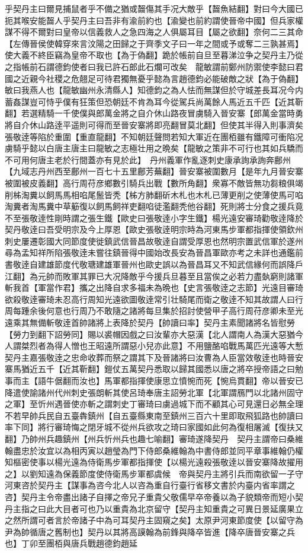 乎契丹主曰爾見捕鼠者乎不備之猶或齧傷其手况大敵乎【齧魚結翻】對曰今大國已扼其喉安能齧人乎契丹主曰吾非有渝前約也【渝變也前約謂使晉帝中國】但兵家權謀不得不爾對曰皇帝以信義救人之急四海之人俱屬耳目【屬之欲翻】奈何二三其命【左傳晉侯使韓穿來言汶陽之田歸之于齊季文子曰一年之間或予或奪二三孰甚焉】使大義不終臣竊為皇帝不取也【為于偽翻】跪於帳前自旦至暮涕泣争之契丹主乃從之指帳前石謂德鈞使者曰我已許石郎此石爛可改矣　龍敏謂前鄭州防禦使李懿曰君國之近親今社稷之危翹足可待君獨無憂乎懿為言趙德鈞必能破敵之狀【為于偽翻】敏曰我燕人也【龍敏幽州永清縣人】知德鈞之為人怯而無謀但於守城差長耳况今内蓄姦謀豈可恃乎僕有狂策但恐朝廷不肯為耳今從駕兵尚萬餘人馬近五千匹【近其靳翻】若選精騎一千使僕與郎萬金將之自介休山路夜冒虜騎入晉安寨【郎萬金當時勇將自介休山路逹平遥則可得而至晉安寨將即亮翻冒莫北翻】但使其半得入則事濟矣張敬逹等陷於重圍【重直龍翻】不知朝廷聲問若知大軍近在團栢雖有鐵障可衝陷况虜騎乎懿以白唐主唐主曰龍敏之志極壮用之晩矣【龍敏之策非不可行也其如兵驕而不可用何唐主老於行間蓋亦有見於此】　丹州義軍作亂逐刺史康承詢承詢奔鄜州【九域志丹州西至鄜州一百七十五里鄜芳蕪翻】晉安寨被圍數月【是年九月晉安寨被圍被皮義翻】高行周苻彦鄉數引騎兵出戰【數所角翻】衆寡不敵皆無功芻粮俱竭削柹淘糞以飼馬馬相啗尾鬛皆秃【柹方肺翻斫木札也木札已薄更削之使薄使馬可啗淘糞者淘馬糞中草䈥復以飼馬飼祥吏翻啗徒濫翻秃他谷翻】死則將士分食之援兵竟不至張敬逹性剛時謂之張生鐵【歐史曰張敬逹小字生鐵】楊光遠安審琦勸敬逹降於契丹敬逹曰吾受明宗及今上厚恩【歐史張敬逹明宗時為河東馬步軍都指揮使領欽州刺史屢遷彰國大同節度使徙鎮武信晉昌故敬逹自謂受厚恩也然明宗置武信軍於遂州尋為孟知祥所陷張敬逹未嘗往鎮晉得中國始改長安為晉昌軍歐亦考之未詳也通鑑前書敬逹自建雄節度代敬瑭建雄軍晉州也歐史誤以為晉昌耳又不知武信緣何而誤降戶江翻】為元帥而敗軍其罪已大况降敵乎今援兵旦暮至且當俟之必若力盡埶窮則諸軍斬我首【軍當作君】攜之出降自求多福未為晩也【史言張敬逹之志節】光遠目審琦欲殺敬逹審琦未忍高行周知光遠欲圖敬逹常引壮騎尾而衛之敬逹不知其故謂人曰行周每踵余後何意也行周乃不敢隨之諸將每旦集於招討使營甲子高行周苻彦卿未至光遠乘其無備斬敬逹首帥諸將上表降於契丹【帥讀曰率】契丹主素聞諸將名皆慰勞【勞力到翻下詔勞同】賜以裘帽因戲之曰汝輩亦大惡漢【北人謂南人為漢大惡猶今人謂桀烈者為得人憎也王昭遠所謂惡小兒亦此意】不用鹽酪啗戰馬萬匹光遠等大慙契丹主嘉張敬逹之忠命收葬而祭之謂其下及晉諸將曰汝曹為人臣當效敬逹也時晉安寨馬猶近五千【近其靳翻】鎧仗五萬契丹悉取以歸其國悉以唐之將卒授帝語之曰勉事而主【語牛倨翻而汝也】馬軍都指揮使康思立憤惋而死【惋烏貫翻】帝以晉安已降遣使諭諸州代州刺史張朗斬其使呂琦奉唐主詔勞北軍【北軍謂鴈門以北諸州固守之軍】至忻州遇晉使亦斬之謂刺史丁審琦曰虜過城下而不顧其心可見還日必無全理不若早帥兵民自五臺犇鎮州【自五臺縣東南至鎮州三百六十里即取飛狐路也帥讀曰率下同】將行審琦悔之閉牙城不從州兵欲攻之琦曰家國如此何為復相屠滅【復扶又翻】乃帥州兵趣鎮州【州兵忻州兵也趣七喻翻】審琦遂降契丹　契丹主謂帝曰桑維翰盡忠於汝宜以為相丙寅以趙瑩為門下侍郎桑維翰為中書侍郎並同平章事維翰仍權知樞密使事以楊光遠為侍衛馬步軍都指揮使【以楊光遠殺張敬逹以晉安寨降故擢用之】以劉知遠為保義節度使侍衛馬步軍都虞候　帝與契丹主將引兵而南欲留一子守河東咨於契丹主【謀事為咨今北人以咨為重自行臺行省移文書於内臺内省率謂之咨】契丹主令帝盡出諸子自擇之帝兄子重貴父敬儒早卒帝養以為子貌類帝而短小契丹主指之曰此大目者可也乃以重貴為北京留守【契丹主知重貴之可異日景延廣果立之然所謂可者言於帝諸子中為可耳契丹主固窺之矣】太原尹河東節度使【以留守為尹為帥循唐之舊制也】契丹以其將高謨翰為前鋒與降卒皆進【降卒唐晉安寨之兵也】丁卯至團栢與唐兵戰趙德鈞趙延